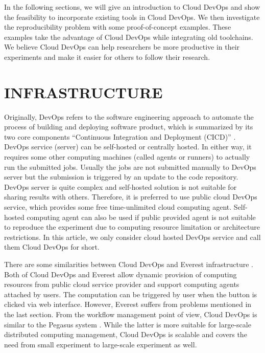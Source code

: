 \documentclass[10pt, conference, compsocconf]{IEEEtran}
\begin{document}
In the following sections, we will give an introduction to Cloud DevOps and show the feasibility to incorporate existing tools in Cloud DevOps. We then investigate the reproducibility problem with some proof-of-concept examples. These examples take the advantage of Cloud DevOps while integrating old toolchains. We believe Cloud DevOps can help researchers be more productive in their experiments and make it easier for others to follow their research.
 
\section{INFRASTRUCTURE}
Originally, DevOps refers to the software engineering approach to automate the process of building and deploying software product, which is summarized by its two core components ``Continuous Integration and Deployment (CICD)'' \cite{leite2019survey}.
DevOps service (server) can be self-hosted or centrally hosted. In either way, it requires some other computing machines (called agents or runners) to actually run the submitted jobs. Usually the jobs are not submitted manually to DevOps server but the submission is triggered by an update to the code repository. 
DevOps server is quite complex and self-hosted solution is not suitable for sharing results with others. Therefore, it is preferred to use public cloud DevOps service, which provides some free time-unlimited cloud computing agent. Self-hosted computing agent can also be used if public provided agent is not suitable to reproduce the experiment due to computing resource limitation or architecture restrictions. In this article, we only consider cloud hosted DevOps service and call them Cloud DevOps for short.

There are some similarities between Cloud DevOps and Everest infrastructure \cite{VOLKOV2017112} . Both of Cloud DevOps and Everest allow dynamic provision of computing resources from public cloud service provider and support computing agents attached by users. The computation can be triggered by user when the button is clicked via web interface.
However, Everest suffers from problems mentioned in the last section. From the workflow management point of view, Cloud DevOps is similar to the Pegasus system \cite{Pegasus}. While the latter is more suitable for large-scale distributed computing management, Cloud DevOps is scalable and covers the need from small experiment to large-scale experiment as well.
\end{document}
